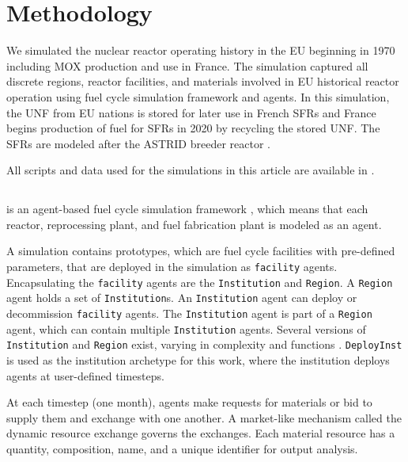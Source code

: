 
\section{Methodology}
We simulated the nuclear reactor operating history in the \gls{EU} beginning in 
1970 including \gls{MOX} production and use in France. 
The simulation captured all discrete regions, reactor facilities, and materials 
involved in \gls{EU} historical reactor operation
using \Cyclus fuel cycle simulation framework and \Cycamore agents.
In this simulation, the \gls{UNF} from \gls{EU} nations is stored for later use 
in French \glspl{SFR} and France begins production of fuel for \glspl{SFR}
in 2020 by recycling the stored \gls{UNF}.
The \glspl{SFR} are modeled after the \gls{ASTRID} breeder reactor \cite{varaine_pre-conceptual_2012}.

All scripts and data used for the simulations in this article are available in 
\cite{bae_arfc/transition-scenarios:_2017}.


\subsection{\Cyclus}

\Cyclus is an agent-based fuel cycle simulation framework 
\cite{huff_fundamental_2016}, which means 
that each reactor, reprocessing plant, and fuel fabrication plant is modeled as an agent.

A \Cyclus simulation contains prototypes, which are fuel cycle facilities with
pre-defined parameters, that are deployed in the simulation as \texttt{facility} agents.
Encapsulating the \texttt{facility} agents are the \texttt{Institution} and \texttt{Region}.
A \texttt{Region} agent holds a set of \texttt{Institution}s. 
An \texttt{Institution} agent can deploy or decommission \texttt{facility} agents.
The \texttt{Institution} agent is part of a \texttt{Region} agent,
which can contain multiple \texttt{Institution} agents. Several versions of \texttt{Institution}
and \texttt{Region} exist, varying in complexity and functions \cite{huff_extensions_2014}.
 \texttt{DeployInst} is used as the institution archetype for this work, where the institution
deploys agents at user-defined timesteps. 

At each timestep (one month),
agents make requests for materials or bid to supply them and exchange
with one another. A market-like mechanism called the dynamic resource exchange
\cite{gidden_agent-based_2015} governs the exchanges.
Each material resource has a quantity, composition, name, and a unique identifier
for output analysis. 

